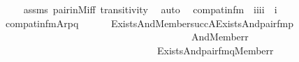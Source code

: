 \begin{isabellebody}
\ \ \ \ \isamarkupfalse%
\ assms\ pair{\isacharunderscore}{\kern0pt}in{\isacharunderscore}{\kern0pt}M{\isacharunderscore}{\kern0pt}iff\ transitivity\ \isamarkupfalse%
\ auto\isanewline
{}\isamarkupfalse%
%
\endisatagproof
{\isafoldproof}%
%
\isadelimproof
\isanewline
%
\endisadelimproof
\isanewline
{}\isamarkupfalse%
\isanewline
\ \ compat{\isacharunderscore}{\kern0pt}in{\isacharunderscore}{\kern0pt}fm\ {\isacharcolon}{\kern0pt}{\isacharcolon}{\kern0pt}\ {\isachardoublequoteopen}{\isacharbrackleft}{\kern0pt}i{\isacharcomma}{\kern0pt}i{\isacharcomma}{\kern0pt}i{\isacharcomma}{\kern0pt}i{\isacharbrackright}{\kern0pt}\ {\isasymRightarrow}\ i{\isachardoublequoteclose}\ \isanewline
\ \ {\isachardoublequoteopen}compat{\isacharunderscore}{\kern0pt}in{\isacharunderscore}{\kern0pt}fm{\isacharparenleft}{\kern0pt}A{\isacharcomma}{\kern0pt}r{\isacharcomma}{\kern0pt}p{\isacharcomma}{\kern0pt}q{\isacharparenright}{\kern0pt}\ {\isasymequiv}\ \isanewline
\ \ \ \ Exists{\isacharparenleft}{\kern0pt}And{\isacharparenleft}{\kern0pt}Member{\isacharparenleft}{\kern0pt}{}{\isacharcomma}{\kern0pt}succ{\isacharparenleft}{\kern0pt}A{\isacharparenright}{\kern0pt}{\isacharparenright}{\kern0pt}{\isacharcomma}{\kern0pt}Exists{\isacharparenleft}{\kern0pt}And{\isacharparenleft}{\kern0pt}pair{\isacharunderscore}{\kern0pt}fm{\isacharparenleft}{\kern0pt}{}{\isacharcomma}{\kern0pt}p{\isacharhash}{\kern0pt}{\isacharplus}{\kern0pt}{}{\isacharcomma}{\kern0pt}{}{\isacharparenright}{\kern0pt}{\isacharcomma}{\kern0pt}\isanewline
\ \ \ \ \ \ \ \ \ \ \ \ \ \ \ \ \ \ \ \ \ \ \ \ \ \ \ \ \ \ \ \ \ \ \ \ \ \ \ \ And{\isacharparenleft}{\kern0pt}Member{\isacharparenleft}{\kern0pt}{}{\isacharcomma}{\kern0pt}r{\isacharhash}{\kern0pt}{\isacharplus}{\kern0pt}{}{\isacharparenright}{\kern0pt}{\isacharcomma}{\kern0pt}\isanewline
\ \ \ \ \ \ \ \ \ \ \ \ \ \ \ \ \ \ \ \ \ \ \ \ \ \ \ \ \ \ \ \ \ Exists{\isacharparenleft}{\kern0pt}And{\isacharparenleft}{\kern0pt}pair{\isacharunderscore}{\kern0pt}fm{\isacharparenleft}{\kern0pt}{}{\isacharcomma}{\kern0pt}q{\isacharhash}{\kern0pt}{\isacharplus}{\kern0pt}{}{\isacharcomma}{\kern0pt}{}{\isacharparenright}{\kern0pt}{\isacharcomma}{\kern0pt}Member{\isacharparenleft}{\kern0pt}{}{\isacharcomma}{\kern0pt}r{\isacharhash}{\kern0pt}{\isacharplus}{\kern0pt}{}{\isacharparenright}{\kern0pt}{\isacharparenright}{\kern0pt}{\isacharparenright}{\kern0pt}{\isacharparenright}{\kern0pt}{\isacharparenright}{\kern0pt}{\isacharparenright}{\kern0pt}{\isacharparenright}{\kern0pt}{\isacharparenright}{\kern0pt}{\isachardoublequoteclose}\ \isanewline

\end{isabellebody}
